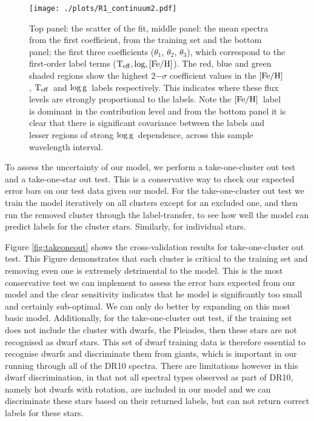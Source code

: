 \documentclass[12pt, preprint]{aastex}
\newcommand{\teff}{\mbox{$\rm T_{eff}$}}
\newcommand{\feh}{\mbox{$\rm [Fe/H]$}}
\newcommand{\logg}{\mbox{$\rm \log g$}}
\begin{document}
 
\begin{figure}[h!]
\centering
    \texttt{[image: ./plots/R1\_continuum2.pdf]}
  \caption{Top panel: the scatter of the fit, middle panel: the mean spectra from the first coefficient, from the training set and the bottom panel; the first three coefficients ($\theta_1$, $\theta_2$, $\theta_3$),  which correspond to the first-order label terms ($\teff, \log, \feh$).   The red, blue and green shaded regions show the highest 2$-\sigma$ coefficient values in the \feh, \teff\ and \logg\ labels respectively. This indicates where these flux levels are strongly proportional to the labels. Note the \feh\ label is dominant in the contribution level and from the bottom panel it is clear that there is significant covariance between the labels and lesser regions of strong \logg\ dependence, across this sample wavelength interval.}
\label{fig:coeffs}
\end{figure}

To assess the uncertainty of our model, we perform a take-one-cluster out test and a take-one-star out test. This is a conservative way to check our expected error bars on our test data given our model. For the take-one-cluster out test we train the model iteratively on all clusters except for an excluded one, and then run the removed cluster through the label-transfer, to see how well the model can predict labels for the cluster stars. Similarly, for individual stars.  

Figure \ref{fig:takeoneout} shows the cross-validation results for take-one-cluster out test. This Figure demonstrates that each cluster is critical to the training set and removing even one is extremely detrimental to the model. This is the most conservative test we can implement to assess the error bars expected from our model and the clear sensitivity indicates that he model is significantly too small and certainly sub-optimal. We can only do better by expanding on this most basic model. Additionally, for the take-one-cluster out test, if the training set does not include the cluster with dwarfs, the Pleiades, then these stars are not recognised as dwarf stars. This set of dwarf training data is therefore essential to recognise dwarfs and discriminate them from giants, which is important in our running through all of the DR10 spectra. There are limitations however in this dwarf discrimination, in that not all spectral types observed as part of DR10, namely hot dwarfs with rotation, are included in our model and we can discriminate these stars based on their returned labels, but can not return correct labels for these stars. 
\end{document}
